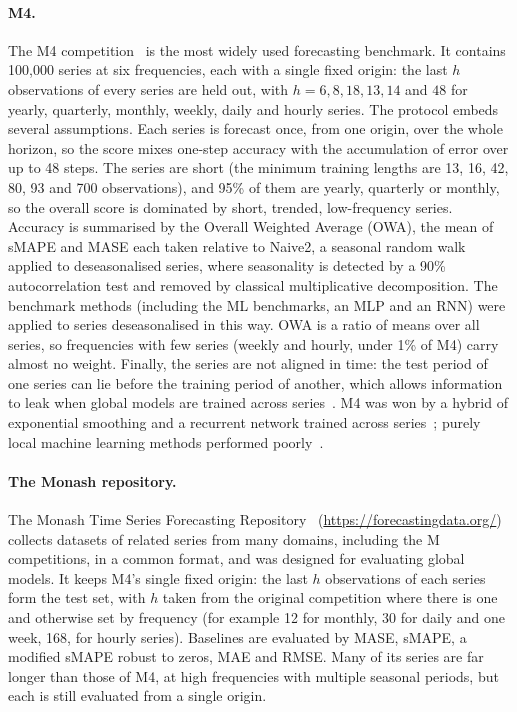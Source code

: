 \paragraph{M4.}
The M4 competition~\citep{makridakis2020m4} is the most widely used forecasting
benchmark. It contains 100{,}000 series at six frequencies, each with a single
fixed origin: the last $h$ observations of every series are held out, with
$h=6, 8, 18, 13, 14$ and $48$ for yearly, quarterly, monthly, weekly, daily and
hourly series. The protocol embeds several assumptions. Each series is
forecast once, from one origin, over the whole horizon, so the score mixes
one-step accuracy with the accumulation of error over up to 48 steps. The
series are short (the minimum training lengths are 13, 16, 42, 80, 93 and 700
observations), and 95\% of them are yearly, quarterly or monthly, so the
overall score is dominated by short, trended, low-frequency series. Accuracy is
summarised by the Overall Weighted Average (OWA), the mean of sMAPE and MASE
each taken relative to Naive2, a seasonal random walk applied to
deseasonalised series, where seasonality is detected by a 90\% autocorrelation
test and removed by classical multiplicative decomposition. The benchmark
methods (including the ML benchmarks, an MLP and an RNN) were applied to series
deseasonalised in this way. OWA is a ratio of means over all series, so
frequencies with few series (weekly and hourly, under 1\% of M4) carry almost
no weight. Finally, the series are not aligned in time: the test period of one
series can lie before the training period of another, which allows information
to leak when global models are trained across series~\citep{ingel2020correlated,hewamalage2023forecast}.
M4 was won by a hybrid of exponential smoothing and a recurrent network trained
across series~\citep{smyl2020hybrid}; purely local machine learning methods
performed poorly~\citep{makridakis2018m4results}.

\paragraph{The Monash repository.}
The Monash Time Series Forecasting Repository~\citep{godahewa2021monash}
(\url{https://forecastingdata.org/}) collects datasets of related series from
many domains, including the M competitions, in a common format, and was
designed for evaluating global models. It keeps M4's single fixed origin: the
last $h$ observations of each series form the test set, with $h$ taken from the
original competition where there is one and otherwise set by frequency (for
example 12 for monthly, 30 for daily and one week, 168, for hourly series).
Baselines are evaluated by MASE, sMAPE, a modified sMAPE robust to zeros, MAE
and RMSE. Many of its series are far longer than those of M4, at high
frequencies with multiple seasonal periods, but each is still evaluated from a
single origin.


